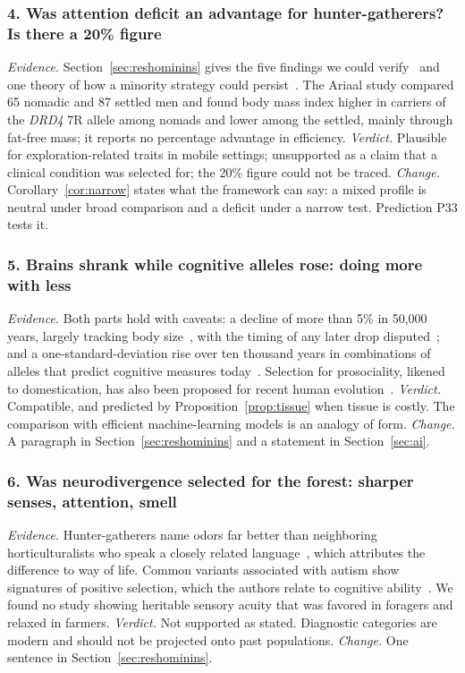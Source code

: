 \subsubsection{4. Was attention deficit an advantage for hunter-gatherers? Is there a 20\% figure}
\emph{Evidence.} Section~\ref{sec:reshominins} gives the five findings we could verify~\cite{ding2002,matthews2011,eisenberg2008,barack2024,esteller2020}
and one theory of how a minority strategy could persist~\cite{williams2006}. The Ariaal study compared 65 nomadic and 87
settled men and found body mass index higher in carriers of the \textit{DRD4} 7R allele among nomads and lower among the
settled, mainly through fat-free mass; it reports no percentage advantage in efficiency. \emph{Verdict.} Plausible for
exploration-related traits in mobile settings; unsupported as a claim that a clinical condition was selected for; the 20\%
figure could not be traced. \emph{Change.} Corollary~\ref{cor:narrow} states what the framework can say: a mixed profile is
neutral under broad comparison and a deficit under a narrow test. Prediction P33 tests it.

\subsubsection{5. Brains shrank while cognitive alleles rose: doing more with less}
\emph{Evidence.} Both parts hold with caveats: a decline of more than 5\% in 50,000 years, largely tracking body
size~\cite{stibel2021,ruff1997}, with the timing of any later drop disputed~\cite{desilva2021,villmoare2022}; and a
one-standard-deviation rise over ten thousand years in combinations of alleles that predict cognitive measures
today~\cite{akbari2026}. Selection for prosociality, likened to domestication, has also been proposed for recent human
evolution~\cite{hare2017}. \emph{Verdict.} Compatible, and predicted by Proposition~\ref{prop:tissue} when tissue is costly. The
comparison with efficient machine-learning models is an analogy of form. \emph{Change.} A paragraph in
Section~\ref{sec:reshominins} and a statement in Section~\ref{sec:ai}.

\subsubsection{6. Was neurodivergence selected for the forest: sharper senses, attention, smell}
\emph{Evidence.} Hunter-gatherers name odors far better than neighboring horticulturalists who speak a closely related
language~\cite{majid2018}, which attributes the difference to way of life. Common variants associated with autism show
signatures of positive selection, which the authors relate to cognitive ability~\cite{polimanti2017}. We found
no study showing heritable sensory acuity that was favored in foragers and relaxed in farmers. \emph{Verdict.} Not
supported as stated. Diagnostic categories are modern and should not be projected onto past populations. \emph{Change.}
One sentence in Section~\ref{sec:reshominins}.

